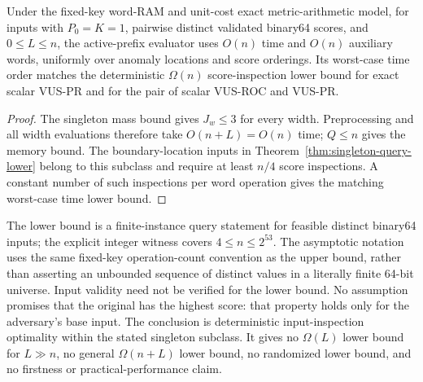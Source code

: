 \begin{corollary}
\label{cor:singleton-linear-optimal}
Under the fixed-key word-RAM and unit-cost exact metric-arithmetic model,
for inputs with $P_0=K=1$, pairwise distinct validated binary64 scores,
and $0\le L\le n$, the active-prefix evaluator uses $O(n)$ time and
$O(n)$ auxiliary words, uniformly over anomaly locations and score
orderings. Its worst-case time order matches the deterministic
$\Omega(n)$ score-inspection lower bound for exact scalar VUS-PR and for
the pair of scalar VUS-ROC and VUS-PR.
\end{corollary}
\begin{proof}
The singleton mass bound gives $J_w\le3$ for every width. Preprocessing and
all width evaluations therefore take $O(n+L)=O(n)$ time; $Q\le n$ gives
the memory bound. The boundary-location inputs in
Theorem~\ref{thm:singleton-query-lower} belong to this subclass and require
at least $n/4$ score inspections. A constant number of such inspections per
word operation gives the matching worst-case time lower bound.
\end{proof}

The lower bound is a finite-instance query statement for feasible distinct
binary64 inputs; the explicit integer witness covers $4\le n\le2^{53}$.
The asymptotic notation uses the same fixed-key operation-count convention
as the upper bound, rather than asserting an unbounded sequence of distinct
values in a literally finite 64-bit universe. Input validity need not be
verified for the lower bound. No assumption promises that the original
has the highest score: that property holds only for the adversary's base
input. The conclusion is deterministic input-inspection optimality within
the stated singleton subclass. It gives no $\Omega(L)$ lower bound for
$L\gg n$, no general $\Omega(n+L)$ lower bound, no randomized lower bound,
and no firstness or practical-performance claim.

